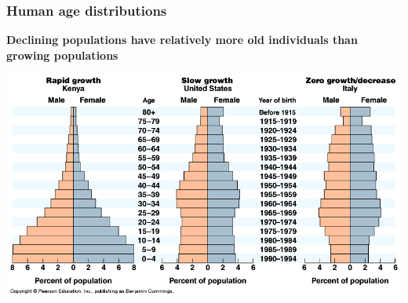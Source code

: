 \documentclass[color=usenames,dvipsnames]{beamer}\usepackage[]{graphicx}\usepackage[]{xcolor}
\begin{document}
\begin{frame}
  \frametitle{Human age distributions}
  {\centering \bf Declining populations have relatively more old individuals than
  growing populations \\}
  \begin{center}
    \includegraphics[width=\textwidth]{figs/AgeStructures}
  \end{center}
\end{frame}











\end{document}
